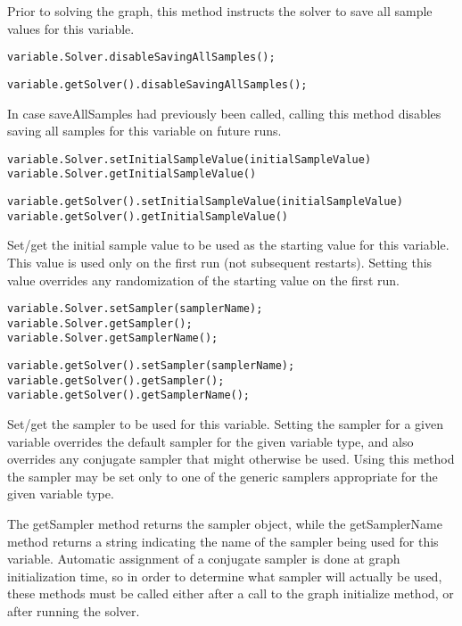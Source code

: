 Prior to solving the graph, this method instructs the solver to save all sample values for this variable.

\ifmatlab
\begin{lstlisting}
variable.Solver.disableSavingAllSamples();
\end{lstlisting}
\fi

\ifjava
\begin{lstlisting}
variable.getSolver().disableSavingAllSamples();
\end{lstlisting}
\fi

In case saveAllSamples had previously been called, calling this method disables saving all samples for this variable on future runs.

\ifmatlab
\begin{lstlisting}
variable.Solver.setInitialSampleValue(initialSampleValue)
variable.Solver.getInitialSampleValue()
\end{lstlisting}
\fi

\ifjava
\begin{lstlisting}
variable.getSolver().setInitialSampleValue(initialSampleValue)
variable.getSolver().getInitialSampleValue()
\end{lstlisting}
\fi

Set/get the initial sample value to be used as the starting value for this variable.  This value is used only on the first run (not subsequent restarts).  Setting this value overrides any randomization of the starting value on the first run.


\ifmatlab
\begin{lstlisting}
variable.Solver.setSampler(samplerName);
variable.Solver.getSampler();
variable.Solver.getSamplerName();
\end{lstlisting}
\fi

\ifjava
\begin{lstlisting}
variable.getSolver().setSampler(samplerName);
variable.getSolver().getSampler();
variable.getSolver().getSamplerName();
\end{lstlisting}
\fi

Set/get the sampler to be used for this variable.  Setting the sampler for a given variable overrides the default sampler for the given variable type, and also overrides any conjugate sampler that might otherwise be used.  Using this method the sampler may be set only to one of the generic samplers appropriate for the given variable type.

The getSampler method returns the sampler object, while the getSamplerName method returns a string indicating the name of the sampler being used for this variable.  Automatic assignment of a conjugate sampler is done at graph initialization time, so in order to determine what sampler will actually be used, these methods must be called either after a call to the graph initialize method, or after running the solver.


